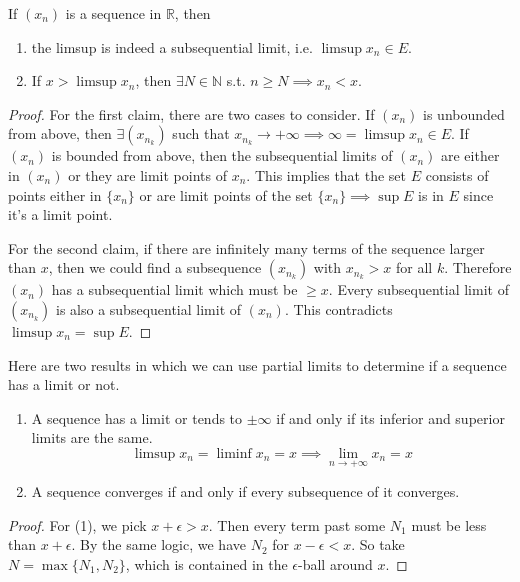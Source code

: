   \begin{lemma} 
    If $(x_n)$ is a sequence in $\mathbb{R}$, then 
    \begin{enumerate}
      \item the limsup is indeed a subsequential limit, i.e. $\limsup x_n \in E$. 
      \item If $x > \limsup x_n$, then $\exists N \in \mathbb{N}$ s.t. $n \geq N \implies x_n < x$. 
    \end{enumerate}
  \end{lemma}
  \begin{proof}
    For the first claim, there are two cases to consider. If $(x_n)$ is unbounded from above, then $\exists (x_{n_k})$ such that $x_{n_k} \rightarrow +\infty \implies \infty = \limsup x_n \in E$. If $(x_n)$ is bounded from above, then the subsequential limits of $(x_n)$ are either in $(x_n)$ or they are limit points of $x_n$. This implies that the set $E$ consists of points either in $\{x_n\}$ or are limit points of the set $\{x_n\} \implies \sup{E}$ is in $E$ since it's a limit point. 

    For the second claim, if there are infinitely many terms of the sequence larger than $x$, then we could find a subsequence $(x_{n_k})$ with $x_{n_k} > x$ for all $k$. Therefore $(x_n)$ has a subsequential limit which must be $\geq x$. Every subsequential limit of $(x_{n_k})$ is also a subsequential limit of $(x_n)$. This contradicts $\limsup x_n = \sup E$. 
  \end{proof}

  \begin{theorem}
    Here are two results in which we can use partial limits to determine if a sequence has a limit or not. 
    \begin{enumerate}
      \item A sequence has a limit or tends to $\pm \infty$ if and only if its inferior and superior limits are the same. 
      \begin{equation}
        \limsup x_n = \liminf x_n = x \implies \lim_{n \rightarrow +\infty} x_n = x
      \end{equation}
      \item A sequence converges if and only if every subsequence of it converges. 
    \end{enumerate}
  \end{theorem}
  \begin{proof}
    For (1), we pick $x + \epsilon > x$. Then every term past some $N_1$ must be less than $x + \epsilon$. By the same logic, we have $N_2$ for $x - \epsilon < x$. So take $N = \max\{N_1, N_2\}$, which is contained in the $\epsilon$-ball around $x$. 
  \end{proof}

